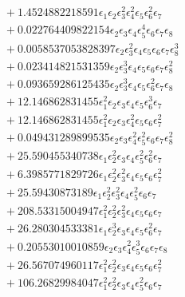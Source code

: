 \documentclass[10pt]{article}
\begin{document}
\begin{align*}
&{}  + 1.4524882218591 \epsilon_{1} \epsilon_{2} \epsilon_{3}^{2} \epsilon_{4}^{2} \epsilon_{5} \epsilon_{6}^{2} \epsilon_{7} \\
&{}  + 0.022764409822154 \epsilon_{2} \epsilon_{3} \epsilon_{4} \epsilon_{5}^{4} \epsilon_{6} \epsilon_{7} \epsilon_{8} \\
&{}  + 0.0058537053828397 \epsilon_{2} \epsilon_{3}^{2} \epsilon_{4} \epsilon_{5} \epsilon_{6} \epsilon_{7} \epsilon_{8}^{3} \\
&{}  + 0.023414821531359 \epsilon_{2} \epsilon_{3}^{3} \epsilon_{4} \epsilon_{5} \epsilon_{6} \epsilon_{7} \epsilon_{8}^{2} \\
&{}  + 0.093659286125435 \epsilon_{2} \epsilon_{3}^{3} \epsilon_{4} \epsilon_{5} \epsilon_{6}^{2} \epsilon_{7} \epsilon_{8} \\
&{}  + 12.146862831455 \epsilon_{1}^{2} \epsilon_{2} \epsilon_{3} \epsilon_{4} \epsilon_{5} \epsilon_{6}^{3} \epsilon_{7} \\
&{}  + 12.146862831455 \epsilon_{1}^{2} \epsilon_{2} \epsilon_{3} \epsilon_{4}^{2} \epsilon_{5} \epsilon_{6} \epsilon_{7}^{2} \\
&{}  + 0.049431289899535 \epsilon_{2} \epsilon_{3} \epsilon_{4}^{2} \epsilon_{5}^{2} \epsilon_{6} \epsilon_{7} \epsilon_{8}^{2} \\
&{}  + 25.590455340738 \epsilon_{1} \epsilon_{2}^{2} \epsilon_{3} \epsilon_{4} \epsilon_{5}^{2} \epsilon_{6}^{2} \epsilon_{7} \\
&{}  + 6.3985771829726 \epsilon_{1} \epsilon_{2}^{2} \epsilon_{3}^{2} \epsilon_{4} \epsilon_{5} \epsilon_{6} \epsilon_{7}^{2} \\
&{}  + 25.59430873189 \epsilon_{1} \epsilon_{2}^{2} \epsilon_{3}^{2} \epsilon_{4} \epsilon_{5}^{2} \epsilon_{6} \epsilon_{7} \\
&{}  + 208.53315004947 \epsilon_{1}^{2} \epsilon_{2}^{2} \epsilon_{3}^{2} \epsilon_{4} \epsilon_{5} \epsilon_{6} \epsilon_{7} \\
&{}  + 26.280304533381 \epsilon_{1} \epsilon_{2}^{3} \epsilon_{3} \epsilon_{4} \epsilon_{5} \epsilon_{6}^{2} \epsilon_{7} \\
&{}  + 0.20553010010859 \epsilon_{2} \epsilon_{3} \epsilon_{4}^{2} \epsilon_{5}^{3} \epsilon_{6} \epsilon_{7} \epsilon_{8} \\
&{}  + 26.567074960117 \epsilon_{1}^{2} \epsilon_{2}^{2} \epsilon_{3} \epsilon_{4} \epsilon_{5} \epsilon_{6} \epsilon_{7}^{2} \\
&{}  + 106.26829984047 \epsilon_{1}^{2} \epsilon_{2}^{2} \epsilon_{3} \epsilon_{4} \epsilon_{5}^{2} \epsilon_{6} \epsilon_{7} \\

\end{align*}
\end{document}
